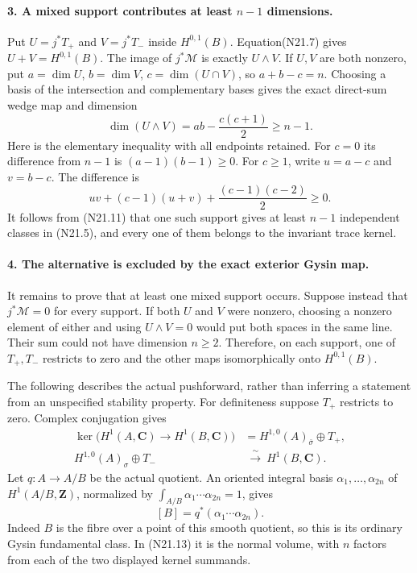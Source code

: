 \paragraph{3. A mixed support contributes at least $n-1$ dimensions.}
Put $U=j^*T_+$ and $V=j^*T_-$ inside $H^{0,1}(B)$.
Equation(N21.7) gives $U+V=H^{0,1}(B)$. The image of
$j^*\mathcal M$ is exactly $U\wedge V$.
If $U,V$ are both nonzero, put
$a=\dim U$, $b=\dim V$, $c=\dim(U\cap V)$, so
$a+b-c=n$. Choosing a basis of the intersection and
complementary bases gives the exact direct-sum wedge map
and dimension
\[
                 \dim(U\wedge V)=ab-\frac{c(c+1)}2
                                               \ge n-1.     \tag{N21.12}
\]
Here is the elementary inequality with all endpoints retained.
For $c=0$ its difference from $n-1$ is
$(a-1)(b-1)\ge0$. For $c\ge1$, write $u=a-c$ and
$v=b-c$. The difference is
\[
          uv+(c-1)(u+v)+\frac{(c-1)(c-2)}2\ge0.
\]
It follows from (N21.11) that one such support gives
at least $n-1$ independent classes in (N21.5), and every
one of them belongs to the invariant trace kernel.

\paragraph{4. The alternative is excluded by the exact exterior Gysin map.}
It remains to prove that at least one mixed support occurs.
Suppose instead that $j^*\mathcal M=0$ for every support.
If both $U$ and $V$ were nonzero, choosing a nonzero
element of either and using $U\wedge V=0$ would put both
spaces in the same line. Their sum could not have dimension
$n\ge2$. Therefore, on each support, one of $T_+,T_-$
restricts to zero and the other maps isomorphically onto
$H^{0,1}(B)$.

The following describes the actual pushforward, rather than
inferring a statement from an unspecified stability property.
For definiteness suppose $T_+$ restricts to zero.
Complex conjugation gives
\[
 \begin{split}
 \ker\bigl(H^1(A,\mathbf C)\to H^1(B,\mathbf C)\bigr)
        &=H^{1,0}(A)_{\bar\sigma}\oplus T_+,\\
 H^{1,0}(A)_\sigma\oplus T_-&\ \xrightarrow{\ \sim\ }\ H^1(B,\mathbf C).
 \end{split}                                                  \tag{N21.13}
\]
Let $q:A\to A/B$ be the actual quotient. An oriented
integral basis $\alpha_1,\ldots,\alpha_{2n}$ of
$H^1(A/B,\mathbf Z)$, normalized by
$\int_{A/B}\alpha_1\cdots\alpha_{2n}=1$, gives
\[
 [B]=q^*(\alpha_1\cdots\alpha_{2n}).
                                                               \tag{N21.14}
\]
Indeed $B$ is the fibre over a point of this smooth quotient,
so this is its ordinary Gysin fundamental class. In
(N21.13) it is the normal volume, with $n$ factors from
each of the two displayed kernel summands.

